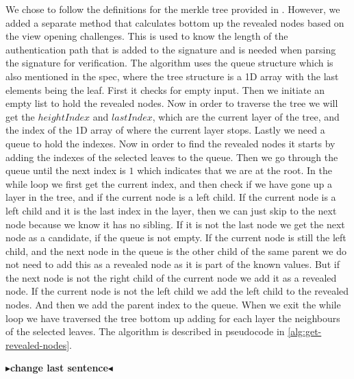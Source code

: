 \documentclass[11pt]{report}
\theoremstyle{definition}
\theoremstyle{plain}
\newcommand{\todo}[1]{{\color[rgb]{.5,0,0}\textbf{$\blacktriangleright$#1$\blacktriangleleft$}}}
\begin{document}
We chose to follow the definitions for the merkle tree provided in \cite{aguilarsyndrome11}. However, we added a separate method that calculates bottom up the revealed nodes based on the view opening challenges. This is used to know the length of the authentication path that is added to the signature and is needed when parsing the signature for verification. The algorithm uses the queue structure which is also mentioned in the spec, where the tree structure is a 1D array with the last elements being the leaf. First it checks for empty input. Then we initiate an empty list to hold the revealed nodes. Now in order to traverse the tree we will get the $heightIndex$ and $lastIndex$, which are the current layer of the tree, and the index of the 1D array of where the current layer stops. Lastly we need a queue to hold the indexes. Now in order to find the revealed nodes it starts by adding the indexes of the selected leaves to the queue. Then we go through the queue until the next index is $1$ which indicates that we are at the root. In the while loop we first get the current index, and then check if we have gone up a layer in the tree, and if the current node is a left child. If the current node is a left child and it is the last index in the layer, then we can just skip to the next node because we know it has no sibling. If it is not the last node we get the next node as a candidate, if the queue is not empty. If the current node is still the left child, and the next node in the queue is the other child of the same parent we do not need to add this as a revealed node as it is part of the known values. But if the next node is not the right child of the current node we add it as a revealed node. If the current node is not the left child we add the left child to the revealed nodes. And then we add the parent index to the queue. When we exit the while loop we have traversed the tree bottom up adding for each layer the neighbours of the selected leaves. The algorithm is described in pseudocode in \autoref{alg:get-revealed-nodes}.

\todo{change last sentence}
\end{document}
